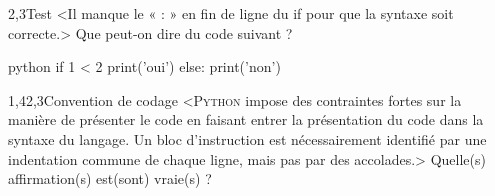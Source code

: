 \begin{quiz}[title={Conditionnelles et syntaxe}]
\begin{quizquestion*}[b]{1}{2,3}{Test}
<Il manque le « {\ttfamily :} » en fin de ligne du {\ttfamily if} pour que la syntaxe soit correcte.> 
Que peut-on dire du code suivant ?
\begin{listingbox}{python}
if 1 < 2
    print('oui')
else:
    print('non')
\end{listingbox}
\end{quizquestion*}

\begin{quizquestion}[b]{1,4}{2,3}{Convention de codage}
<\textsc{Python} impose des contraintes fortes sur la manière de présenter le code en faisant entrer la présentation du code dans la syntaxe du langage. Un bloc d'instruction est nécessairement identifié par une indentation commune de chaque ligne, mais pas par des accolades.>
Quelle(s) affirmation(s) est(sont) vraie(s) ?
\end{quizquestion}
\end{quiz}

